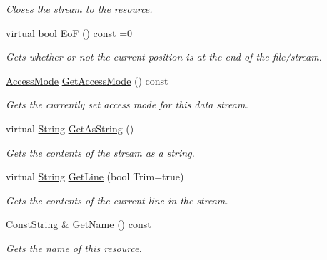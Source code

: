 \begin{DoxyCompactItemize}
\begin{DoxyCompactList}\small\item\em Closes the stream to the resource. \item\end{DoxyCompactList}\item 
virtual bool \hyperlink{classMezzanine_1_1Resource_1_1DataStream_a606ec8602a93ddda483be1454f7e98a4}{EoF} () const =0
\begin{DoxyCompactList}\small\item\em Gets whether or not the current position is at the end of the file/stream. \item\end{DoxyCompactList}\item 
\hyperlink{classMezzanine_1_1Resource_1_1DataStream_afe2916e4ed8c06130d032d99c5a532f2}{AccessMode} \hyperlink{classMezzanine_1_1Resource_1_1DataStream_a8896048db87b3ee57d7e62e72e828b76}{GetAccessMode} () const 
\begin{DoxyCompactList}\small\item\em Gets the currently set access mode for this data stream. \item\end{DoxyCompactList}\item 
virtual \hyperlink{namespaceMezzanine_acf9fcc130e6ebf08e3d8491aebcf1c86}{String} \hyperlink{classMezzanine_1_1Resource_1_1DataStream_a62a1623251773ab3a237a548ffb67d6a}{GetAsString} ()
\begin{DoxyCompactList}\small\item\em Gets the contents of the stream as a string. \item\end{DoxyCompactList}\item 
virtual \hyperlink{namespaceMezzanine_acf9fcc130e6ebf08e3d8491aebcf1c86}{String} \hyperlink{classMezzanine_1_1Resource_1_1DataStream_a164d641a57fd2dcea7e012d381fedc1f}{GetLine} (bool Trim=true)
\begin{DoxyCompactList}\small\item\em Gets the contents of the current line in the stream. \item\end{DoxyCompactList}\item 
\hyperlink{namespaceMezzanine_a63cd699ac54b73953f35ec9cfc05e506}{ConstString} \& \hyperlink{classMezzanine_1_1Resource_1_1DataStream_ac1b962945968bf5076b7cf0b09c83f9c}{GetName} () const 
\begin{DoxyCompactList}\small\item\em Gets the name of this resource. \item\end{DoxyCompactList}\item 

\end{DoxyCompactItemize}
